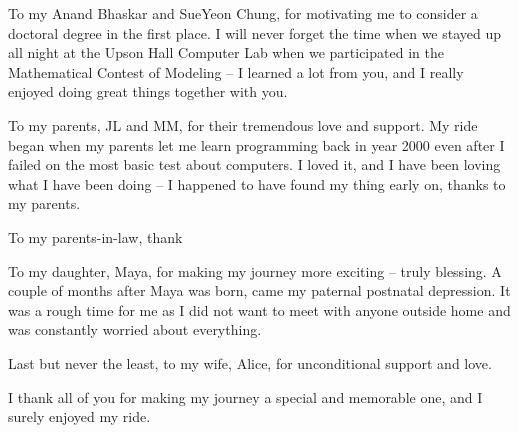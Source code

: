 To my Anand Bhaskar and SueYeon Chung, for motivating me to consider a doctoral degree in the first place. I will never forget the time when we stayed up all night at the Upson Hall Computer Lab when we participated in the Mathematical Contest of Modeling -- I learned a lot from you, and I really enjoyed doing great things together with you. 

To my parents, JL and MM, for their tremendous love and support. My ride began when my parents let me learn programming back in year 2000 even after I failed on the most basic test about computers. I loved it, and I have been loving what I have been doing -- I happened to have found my thing early on, thanks to my parents. 

To my parents-in-law, thank



To my daughter, Maya, for making my journey more exciting -- truly blessing. A couple of months after Maya was born, came my paternal postnatal depression. It was a rough time for me as I did not want to meet with anyone outside home and was constantly worried about everything. 



Last but never the least, to my wife, Alice, for unconditional support and love.

I thank all of you for making my journey a special and memorable one, and I surely enjoyed my ride.


